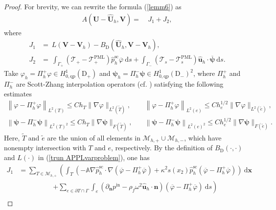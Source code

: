 \documentclass[final,3p,times]{elsarticle}
\begin{document}
\begin{proof}
	For brevity, we can rewrite the formula (\ref{lemm6}) as
	\begin{align}\label{4.3.1}
		A\left(\boldsymbol{U}-\hat{\boldsymbol{U}}_{h}, \boldsymbol{V}\right)
		=&~ {J}_1 + {J}_2,
	\end{align}
	where
	\begin{align*}
		{J}_1 &=~ L(\boldsymbol{V}-\boldsymbol{V}_h)
		-B_\mathrm{D}\left(\hat{\boldsymbol{U}}_h,\boldsymbol{V}-\boldsymbol{V}_h\right),\\
		{J}_2 & =~ \int_{\Gamma_+}\left(\mathscr{T}_+-\mathscr{T}_+^{\mathrm{PML}}\right)\hat{p}^{\mathrm{sc}}_h \overline{\varphi} \mathrm{~d} s
		+\int_{\Gamma_-}\left(\mathscr{T}_s-\mathscr{T}_s^{\mathrm{PML}}\right)\hat{\boldsymbol{u}}_h \cdot \overline{\boldsymbol{\psi}} \mathrm{~d} s.
	\end{align*}
	Take $\varphi_h=\Pi_h^+ \varphi \in H_{0, \mathrm{qp}}^1\left(\mathrm{D}_+\right)$ and $\boldsymbol{\psi}_h=\Pi_h^-  \boldsymbol{\psi} \in H_{0, \mathrm{qp}}^1\left(\mathrm{D}_-\right)^2$, where $\Pi_h^+$ and $\Pi_h^-$ are Scott-Zhang interpolation operators (cf. \cite{Scott90}) satisfying the following estimates
	\begin{align}
		\left\|\varphi-\Pi_h^+ \varphi\right\|_{L^2(T)} \leq C h_T\|\nabla \varphi\|_{L^2(\tilde{T})},& \quad\left\|\varphi-\Pi_h^+ \varphi\right\|_{L^2(e)} \leq C h_e^{1 / 2}\|\nabla \varphi\|_{L^2(\tilde{e})},\label{inter1}\\
		\left\|\boldsymbol{\psi}-\Pi_h^- \boldsymbol{\psi}\right\|_{L^2(T)^2} \leq C h_T\|\nabla \boldsymbol{\psi}\|_{F(\tilde{T})},& \quad\left\|\boldsymbol{\psi}-\Pi_h^- \boldsymbol{\psi}\right\|_{L^2(e)^2} \leq C h_e^{1 / 2}\|\nabla \boldsymbol{\psi}\|_{F(\tilde{e})}.\label{inter2}
	\end{align}
	Here, $\tilde{T}$ and $\tilde{e}$ are the union of all elements in $\mathscr{M}_{h,+} \cup \mathscr{M}_{h, -}$, which have nonempty intersection with $T$ and  $e$, respectively. By the definition of $B_\mathrm{D}(\cdot, \cdot)$ and $L(\cdot)$ in (\ref{trun APPLvarproblem}), one has
	\begin{align*}
		{J}_1 &= \sum_{T \in \mathscr{M}_{h, +}}  \left(\int_T\left(-\mathbb{A}\nabla  \hat{p}^{\mathrm{sc}}_h \cdot \nabla\left(\overline{\varphi}-\Pi_h^+\overline{\varphi}\right)+\kappa^2 s(x_2) \hat{p}^{\mathrm{sc}}_h\left(\overline{\varphi}-\Pi_h^+\overline{\varphi} \right)\right) \mathrm{~d} \boldsymbol{x}\right. \\
		& \quad\qquad\qquad \left.+\sum_{e \in \partial T \cap \Gamma} \int_e\left(\partial_{\boldsymbol{n}} p^\mathrm{in}-\rho_f \omega^2 \hat{\boldsymbol{u}}_h \cdot \boldsymbol{n}\right)\left(\overline{\varphi}-\Pi_h^+\overline{\varphi}\right) \mathrm{~d} s\right) \\

\end{align*}
\end{proof}
\end{document}
